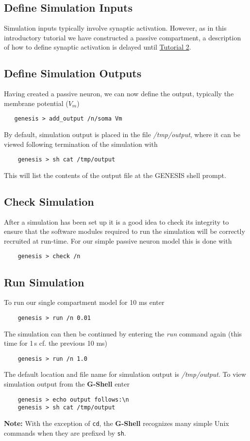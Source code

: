 \documentclass[12pt]{article}
\begin{document}
\subsection*{Define Simulation Inputs}

Simulation inputs typically involve synaptic activation. However, as in this introductory tutorial we have constructed a passive compartment, a description of how to define synaptic activation is delayed until \href{../tutorial2/tutorial2.tex}{Tutorial 2}.  

\subsection*{Define Simulation Outputs}

Having created a passive neuron, we can now define the output, typically the membrane potential ($V_m$)
\begin{verbatim}
   genesis > add_output /n/soma Vm
\end{verbatim}
By default, simulation output is placed in the file {\it /tmp/output}, where it can be viewed following termination of the simulation with
\begin{verbatim}
    genesis > sh cat /tmp/output
\end{verbatim}
This will list the contents of the output file at the GENESIS shell prompt.

\subsection*{Check Simulation}

After a simulation has been set up it is a good idea to check its integrity to ensure that the software modules required to run the simulation will be correctly recruited at run-time. For our simple passive neuron model this is done with 
\begin{verbatim}
    genesis > check /n
\end{verbatim}

\subsection*{Run Simulation}

To run our single compartment model for 10 ms enter
\begin{verbatim}
    genesis > run /n 0.01
\end{verbatim}
The simulation can then be continued by entering the {\it run} command again (this time for 1\,s cf. the previous 10 ms)
\begin{verbatim}
    genesis > run /n 1.0
\end{verbatim}
The default location and file name for simulation output is {\it /tmp/output}. To view simulation output from the {\bf G-Shell} enter
\begin{verbatim}
    genesis > echo output follows:\n
    genesis > sh cat /tmp/output
\end{verbatim}
{\bf Note:} With the exception of {\tt cd}, the {\bf G-Shell} recognizes many simple Unix commands when they are prefixed by {\tt sh}.
    
\end{document}
